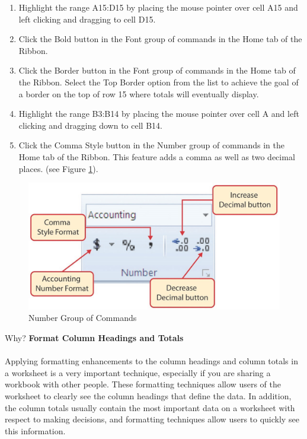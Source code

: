 \begin{enumerate}[resume]
	\item Highlight the range \textsf{A15:D15} by placing the mouse pointer over cell \textsf{A15} and left clicking and dragging to cell \textsf{D15}.
	\item Click the Bold button in the Font group of commands in the Home tab of the Ribbon.
	\item Click the Border button in the Font group of commands in the Home tab of the Ribbon. Select the Top Border option from the list to achieve the goal of a border on the top of row 15 where totals will eventually display.
	\item Highlight the range \textsf{B3:B14} by placing the mouse pointer over cell A and left clicking and dragging down to cell \textsf{B14}.
	\item Click the Comma Style button in the Number group of commands in the Home tab of the Ribbon. This feature adds a comma as well as two decimal places. (see Figure \ref{01:fig35}).
\end{enumerate}

\begin{figure}[H]
	\centering
	\includegraphics[width=\maxwidth{.95\linewidth}]{gfx/ch01_fig35}
	\caption{Number Group of Commands}
	\label{01:fig35}
\end{figure}

\begin{center}
	\begin{infobox}{Why?}
		\textbf{Format Column Headings and Totals}
		\\
		\\
		Applying formatting enhancements to the column headings and column totals in a worksheet is a very important technique, especially if you are sharing a workbook with other people. These formatting techniques allow users of the worksheet to clearly see the column headings that define the data. In addition, the column totals usually contain the most important data on a worksheet with respect to making decisions, and formatting techniques allow users to quickly see this information.
	\end{infobox}
\end{center}


